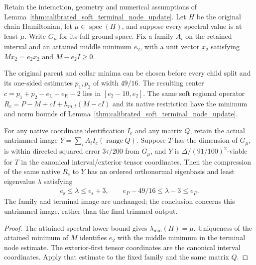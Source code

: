 \begin{lemma}
    \label{lem:selected_soft_terminal_node_energy}
    \leanok
    Retain the interaction, geometry and numerical assumptions of
    Lemma~\ref{thm:calibrated_soft_terminal_node_update}. Let $H$ be the
    original chain Hamiltonian, let $\mu\in\operatorname{spec}(H)$, and
    suppose every spectral value is at least $\mu$. Write $G_\mu$ for its
    full ground space. Fix a family $A_i$ on the retained interval and an
    attained middle minimum $e_2$, with a unit vector $x_2$ satisfying
    $Mx_2=e_2x_2$ and $M-e_2I\ge0$.

    The original parent and collar minima can be chosen before every child
    split and its one-sided estimates $p_1,p_2$ of width $49/16$.
    The resulting center $c=p_1+p_2-e_{\mathrm L}-e_{\mathrm R}-2$ lies
    in $[e_2-10,e_2]$. The same soft regional operator
    $R_c=P-M+cI+h_{m,t}(M-cI)$ and its native restriction have the
    minimum and norm bounds of
    Lemma~\ref{thm:calibrated_soft_terminal_node_update}.

    For any native coordinate identification $I_e$ and any matrix $Q$,
    retain the actual untrimmed image
    $Y=\sum_i A_i I_e(\operatorname{range}Q)$.
    Suppose $T$ has the dimension of $G_\mu$, is within directed squared
    error $3\tau/200$ from $G_\mu$, and $Y$ is
    $\Delta/(91/100)^2$-viable for $T$ in the canonical interval/exterior
    tensor coordinates. Then the compression of the same native $R_c$
    to $Y$ has an ordered orthonormal eigenbasis and least eigenvalue
    $\lambda$ satisfying
    \begin{align}
        e_{\mathrm s}\le\lambda\le e_{\mathrm s}+3,\qquad
        e_P-49/16\le\lambda-3\le e_P.
    \end{align}
    The family and terminal image are unchanged; the conclusion concerns
    this untrimmed image, rather than the final trimmed output.
\end{lemma}
\begin{proof}\leanok
    The attained spectral lower bound gives $\lambda_{\min}(H)=\mu$.
    Uniqueness of the attained minimum of $M$ identifies $e_2$ with the
    middle minimum in the terminal node estimate. The exterior-first
    tensor coordinates are the canonical interval coordinates. Apply that
    estimate to the fixed family and the same matrix $Q$.
\end{proof}
